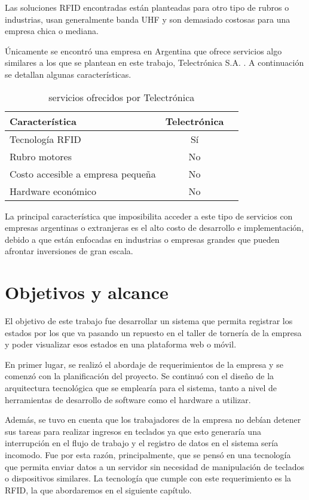 Las soluciones RFID encontradas están planteadas para otro tipo de rubros o industrias, usan generalmente banda UHF y son demasiado costosas para una empresa chica o mediana. 

Únicamente se encontró una empresa en Argentina que ofrece servicios algo similares a los que se plantean en este trabajo, Telectrónica S.A. \citep{WEBSITE:TELECTRONICA}. A continuación se detallan algunas características.

\begin{table}[h]
	\centering
	\caption[caption corto]{servicios ofrecidos por Telectrónica}
	\begin{tabular}{l c c}    
		\toprule
		\textbf{Característica} 	 & \textbf{Telectrónica} 		  \\
		\midrule
		Tecnología RFID	 & Sí				 \\
		Rubro motores & No \\		
		Costo accesible a empresa pequeña	 & No				 \\
		Hardware económico	 & No				 \\
		\bottomrule
		\hline
	\end{tabular}
	\label{tab:peces}
\end{table}

La principal característica que imposibilita acceder a este tipo de servicios con empresas argentinas o extranjeras es el alto costo de desarrollo e implementación, debido a que están enfocadas en industrias o empresas grandes que pueden afrontar inversiones de gran escala.



\section{Objetivos y alcance}

El objetivo de este trabajo fue desarrollar un sistema que permita registrar los estados por los que va pasando un repuesto en el taller de tornería de la empresa y poder visualizar esos estados en una plataforma web o móvil. 

En primer lugar, se realizó el abordaje de requerimientos de la empresa y se comenzó con la planificación del proyecto. Se continuó con el diseño de la arquitectura tecnológica que se emplearía para el sistema, tanto a nivel de herramientas de desarrollo de software como el hardware a utilizar.

Además, se tuvo en cuenta que los trabajadores de la empresa no debían detener sus tareas para realizar ingresos en teclados ya que esto generaría una interrupción en el flujo de trabajo y el registro de datos en el sistema sería incomodo. Fue por esta razón, principalmente, que se pensó en una tecnología que permita enviar datos a un servidor sin necesidad de manipulación de teclados o dispositivos similares. La tecnología que cumple con este requerimiento es la RFID, la que abordaremos en el siguiente capítulo.

